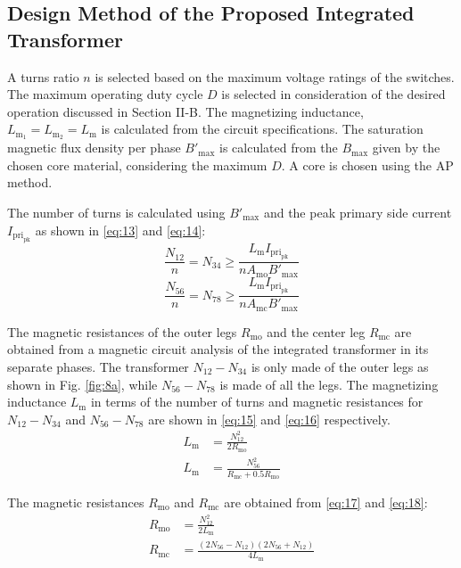 \documentclass[lettersize,journal]{IEEEtran}
\begin{document}
\subsection{Design Method of the Proposed Integrated Transformer}
A turns ratio $n$ is selected based on the maximum voltage ratings of the switches. The maximum operating duty cycle $D$ is selected in consideration of the desired operation discussed in Section II-B. The magnetizing inductance, $L_{\mathrm{m}_1}=L_{\mathrm{m}_2}=L_{\mathrm{m}}$ is calculated from the circuit specifications. The saturation magnetic flux density per phase $B'_{\mathrm{max}}$ is calculated from the $B_{\mathrm{max}}$ given by the chosen core material, considering the maximum $D$. A core is chosen using the AP method. 

The number of turns is calculated using $B'_{\mathrm{max}}$ and the peak primary side current $I_{\mathrm{pri}_{\mathrm{pk}}}$ as shown in \eqref{eq:13} and \eqref{eq:14}:
\begin{equation}
\label{eq:13}
\frac{N_{12}}{n} = N_{34} \ge \frac{L_{\mathrm{m}} I_{\mathrm{pri}_{\mathrm{pk}}}}{n A_{\mathrm{mo}} B'_{\mathrm{max}}}
\end{equation}
\begin{equation}
\label{eq:14}
\frac{N_{56}}{n} = N_{78} \ge \frac{L_{\mathrm{m}} I_{\mathrm{pri}_{\mathrm{pk}}}}{n A_{\mathrm{mc}} B'_{\mathrm{max}}}
\end{equation}

The magnetic resistances of the outer legs $R_{\mathrm{mo}}$ and the center leg $R_{\mathrm{mc}}$ are obtained from a magnetic circuit analysis of the integrated transformer in its separate phases. The transformer $N_{12}-N_{34}$ is only made of the outer legs as shown in Fig. \ref{fig:8a}, while $N_{56}-N_{78}$ is made of all the legs. The magnetizing inductance $L_{\mathrm{m}}$ in terms of the number of turns and magnetic resistances for $N_{12}-N_{34}$ and $N_{56}-N_{78}$ are shown in \eqref{eq:15} and \eqref{eq:16} respectively.
\begin{align}
L_{\mathrm{m}} &= \frac{N_{12}^2}{2 R_{\mathrm{mo}}} \label{eq:15}\\
L_{\mathrm{m}} &= \frac{N_{56}^2}{R_{\mathrm{mc}} + 0.5 R_{\mathrm{mo}}} \label{eq:16}
\end{align}

The magnetic resistances $R_{\mathrm{mo}}$ and $R_{\mathrm{mc}}$ are obtained from \eqref{eq:17} and \eqref{eq:18}:
\begin{align}
R_{\mathrm{mo}} &= \frac{N_{12}^2}{2 L_{\mathrm{m}}} \label{eq:17}\\
R_{\mathrm{mc}} &= \frac{(2 N_{56} - N_{12})(2 N_{56} + N_{12})}{4 L_{\mathrm{m}}} \label{eq:18}
\end{align}
\end{document}
